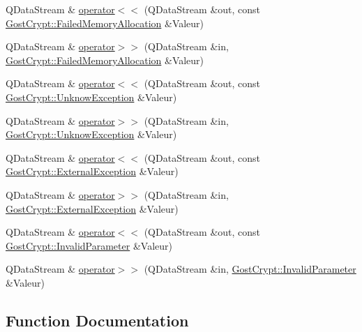 \begin{DoxyCompactItemize}
\item 
Q\+Data\+Stream \& \hyperlink{namespace_gost_crypt_a2f0aae264a4c81f5e7455d8fc2a8da1e}{operator$<$$<$} (Q\+Data\+Stream \&out, const \hyperlink{class_gost_crypt_1_1_failed_memory_allocation}{Gost\+Crypt\+::\+Failed\+Memory\+Allocation} \&Valeur)
\item 
Q\+Data\+Stream \& \hyperlink{namespace_gost_crypt_ab1418c707af012e32eda56005e2d8d35}{operator$>$$>$} (Q\+Data\+Stream \&in, \hyperlink{class_gost_crypt_1_1_failed_memory_allocation}{Gost\+Crypt\+::\+Failed\+Memory\+Allocation} \&Valeur)
\item 
Q\+Data\+Stream \& \hyperlink{namespace_gost_crypt_af125544afc2a9e2975524962f21c13d3}{operator$<$$<$} (Q\+Data\+Stream \&out, const \hyperlink{class_gost_crypt_1_1_unknow_exception}{Gost\+Crypt\+::\+Unknow\+Exception} \&Valeur)
\item 
Q\+Data\+Stream \& \hyperlink{namespace_gost_crypt_a9b8913a36f6eb5c828e321facd702cba}{operator$>$$>$} (Q\+Data\+Stream \&in, \hyperlink{class_gost_crypt_1_1_unknow_exception}{Gost\+Crypt\+::\+Unknow\+Exception} \&Valeur)
\item 
Q\+Data\+Stream \& \hyperlink{namespace_gost_crypt_a0c3976f48a6db48a2bb3173b0482eea7}{operator$<$$<$} (Q\+Data\+Stream \&out, const \hyperlink{class_gost_crypt_1_1_external_exception}{Gost\+Crypt\+::\+External\+Exception} \&Valeur)
\item 
Q\+Data\+Stream \& \hyperlink{namespace_gost_crypt_a38f38fdf8080ca24432ed4dec70ac603}{operator$>$$>$} (Q\+Data\+Stream \&in, \hyperlink{class_gost_crypt_1_1_external_exception}{Gost\+Crypt\+::\+External\+Exception} \&Valeur)
\item 
Q\+Data\+Stream \& \hyperlink{namespace_gost_crypt_ae710832b03f99b679035bfeee67a2fb0}{operator$<$$<$} (Q\+Data\+Stream \&out, const \hyperlink{class_gost_crypt_1_1_invalid_parameter}{Gost\+Crypt\+::\+Invalid\+Parameter} \&Valeur)
\item 
Q\+Data\+Stream \& \hyperlink{namespace_gost_crypt_ae971f90c2d4d1980125c87f71e1fb45b}{operator$>$$>$} (Q\+Data\+Stream \&in, \hyperlink{class_gost_crypt_1_1_invalid_parameter}{Gost\+Crypt\+::\+Invalid\+Parameter} \&Valeur)
\end{DoxyCompactItemize}


\subsection{Function Documentation}
\mbox{\label{namespace_gost_crypt_ab650c0c6902fcf859bb05a79fe90b89e}} 
